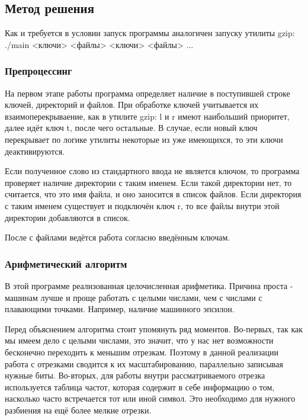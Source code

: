 \documentclass[12pt]{article}
\begin{document}
\subsection*{Метод решения}

Как и требуется в условии запуск программы аналогичен запуску утилиты gzip: ./main <ключи> <файлы> <ключи> <файлы> ...

\subsubsection*{Препроцессинг}

На первом этапе работы программа определяет наличие в поступившей строке ключей, директорий и файлов.
При обработке ключей учитывается их взаимоперекрываение, как в утилите gzip: l и r имеют наибольший приоритет, далее идёт ключ t, после чего остальные. В случае, если новый ключ перекрывает по логике утилиты некоторые из уже имеющихся, то эти ключи деактивируются.

Если полученное слово из стандартного ввода не является ключом, то программа проверяет наличие директории с таким именем. Если такой директории нет, то считается, что это имя файла, и оно заносится в список файлов. Если директория с таким именем существует и подключён ключ r, то все файлы внутри этой директории добавляются в список.

После с файлами ведётся работа согласно введённым ключам.

\subsubsection*{Арифметический алгоритм}

В этой программе реализованная целочисленная арифметика. Причина проста - машинам лучше и проще работать с целыми числами, чем с числами с плавающими точками. Например, наличие машинного эпсилон.

Перед объяснением алгоритма стоит упомянуть ряд моментов. Во-первых, так как мы имеем дело с целыми числами, это значит, что у нас нет возможности бесконечно переходить к меньшим отрезкам. Поэтому в данной реализации работа с отрезками сводится к их масштабированию, параллельно записывая нужные биты. Во-вторых, для работы внутри рассматриваемого отрезка используется таблица частот, которая содержит в себе информацию о том, насколько часто встречается тот или иной символ. Это необходимо для нужного разбиения на ещё более мелкие отрезки.
\end{document}
